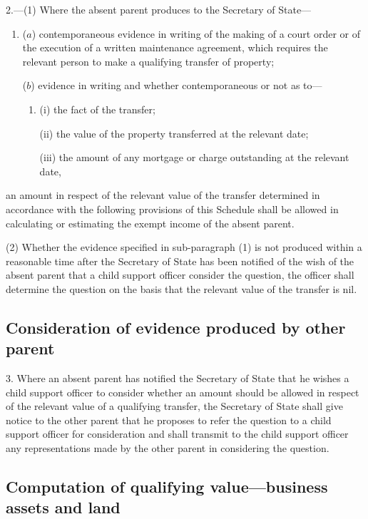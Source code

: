 \documentclass[a4paper]{article}
\begin{document}
2.—(1) Where the absent parent produces to the Secretary of State—
\begin{enumerate}\item[]
($a$) contemporaneous evidence in writing of the making of a court order or of the execution of a written maintenance agreement, which requires the relevant person to make a qualifying transfer of property;

($b$) evidence in writing and whether contemporaneous or not as to—
\begin{enumerate}\item[]
(i) the fact of the transfer;

(ii) the value of the property transferred at the relevant date;

(iii) the amount of any mortgage or charge outstanding at the relevant date,
\end{enumerate}
\end{enumerate}
an amount in respect of the relevant value of the transfer determined in accordance with the following provisions of this Schedule shall be allowed in calculating or estimating the exempt income of the absent parent.

(2) Whether the evidence specified in sub-paragraph (1) is not produced within a reasonable time after the Secretary of State has been notified of the wish of the absent parent that a child support officer consider the question, the officer shall determine the question on the basis that the relevant value of the transfer is nil.

\subsection*{Consideration of evidence produced by other parent}

3.  Where an absent parent has notified the Secretary of State that he wishes a child support officer to consider whether an amount should be allowed in respect of the relevant value of a qualifying transfer, the Secretary of State shall give notice to the other parent that he proposes to refer the question to a child support officer for consideration and shall transmit to the child support officer any representations made by the other parent in considering the question.

\subsection*{{Computation of qualifying value—business assets} and land}
\end{document}
